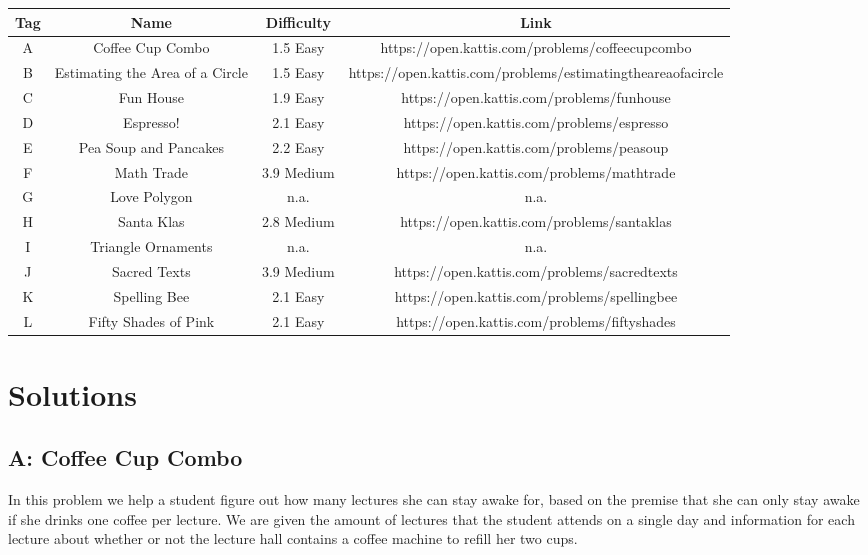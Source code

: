 \documentclass{article}
\begin{document}
\begin{adjustbox}{center}
	\begin{tabular}{ | c | c | c | c | }
		\hline
		\textbf{Tag} & \textbf{Name} & \textbf{Difficulty} & \textbf{Link} \\
		\hline
		\hline
		A & Coffee Cup Combo & 1.5 Easy & https://open.kattis.com/problems/coffeecupcombo \\
		\hline
		B & Estimating the Area of a Circle & 1.5 Easy & https://open.kattis.com/problems/estimatingtheareaofacircle \\
		\hline
		C & Fun House & 1.9 Easy & https://open.kattis.com/problems/funhouse \\
		\hline
		D & Espresso! & 2.1 Easy & https://open.kattis.com/problems/espresso \\
		\hline
		E & Pea Soup and Pancakes & 2.2 Easy & https://open.kattis.com/problems/peasoup \\
		\hline
		F & Math Trade & 3.9 Medium & https://open.kattis.com/problems/mathtrade \\
		\hline
		G & Love Polygon & n.a. & n.a. \\
		\hline
		H & Santa Klas & 2.8 Medium & https://open.kattis.com/problems/santaklas \\
		\hline
		I & Triangle Ornaments & n.a. & n.a. \\
		\hline
		J & Sacred Texts & 3.9 Medium & https://open.kattis.com/problems/sacredtexts \\
		\hline
		K & Spelling Bee & 2.1 Easy & https://open.kattis.com/problems/spellingbee \\
		\hline
		L & Fifty Shades of Pink & 2.1 Easy & https://open.kattis.com/problems/fiftyshades \\
		\hline
	\end{tabular}
\end{adjustbox}

\newpage



\section{Solutions}

\subsection{A: Coffee Cup Combo}

In this problem we help a student figure out how many lectures she can stay awake for, based on the premise that she can only stay awake if she drinks one coffee per lecture. We are given the amount of lectures that the student attends on a single day and information for each lecture about whether or not the lecture hall contains a coffee machine to refill her two cups.
\end{document}
